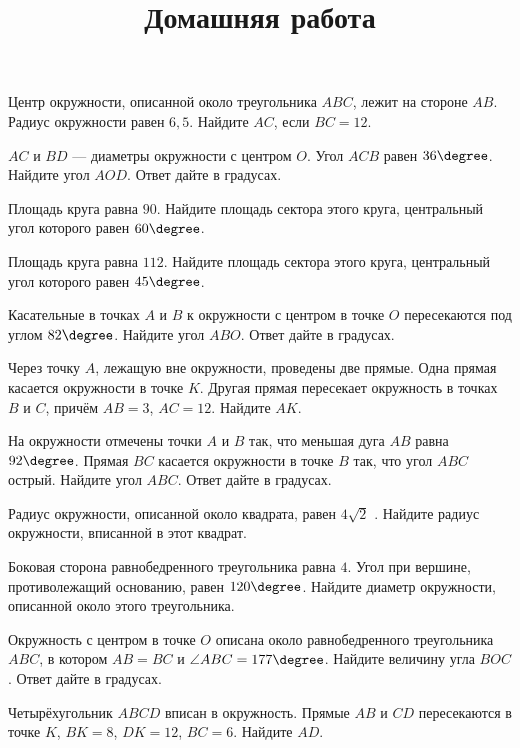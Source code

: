 \begin{consultation}
	\begin{listofex}
		\item Центр окружности, описанной около треугольника \( ABC \), лежит на стороне \( AB \). Радиус окружности равен \( 6,5 \). Найдите \( AC \), если \( BC=12 \).
		\item \( AC \) и \( BD \) --- диаметры окружности с центром \( O \). Угол \( ACB \) равен \( 36\degree \). Найдите угол \( AOD \). Ответ дайте в градусах.
		\item Площадь круга равна \( 90 \). Найдите площадь сектора этого круга, центральный угол которого равен \( 60\degree \).
		\item Площадь круга равна \( 112 \). Найдите площадь сектора этого круга, центральный угол которого равен \( 45\degree \).
		\item Касательные в точках \( A \) и \( B \) к окружности с центром в точке \( O \) пересекаются под углом \( 82\degree \). Найдите угол \( ABO \). Ответ дайте в градусах.
		\item Через точку \( A \), лежащую вне окружности, проведены две прямые. Одна прямая касается окружности в точке \( K \). Другая прямая пересекает окружность в точках \( B \) и \( C \), причём \( AB=3 \), \( AC=12 \). Найдите \( AK \).
		\item На окружности отмечены точки \( A \) и \( B \) так, что меньшая дуга \( AB \) равна \( 92\degree \). Прямая \( BC \) касается окружности в точке \( B \) так, что угол \( ABC \) острый. Найдите угол \( ABC \). Ответ дайте в градусах.
		\item Радиус окружности, описанной около квадрата, равен \( 4\sqrt{2} \) . Найдите радиус окружности, вписанной в этот квадрат.
		\item Боковая сторона равнобедренного треугольника равна \( 4 \). Угол при вершине, противолежащий основанию, равен \( 120\degree \). Найдите диаметр окружности, описанной около этого треугольника.
		\item Окружность с центром в точке \( O \) описана около равнобедренного треугольника \( ABC \), в котором \( AB=BC \) и \( \angle ABC=177\degree \). Найдите величину угла \( BOC \). Ответ дайте в градусах.
		\item Четырёхугольник \( ABCD \) вписан в окружность. Прямые \( AB \) и \( CD \) пересекаются в точке \( K \), \( BK=8 \), \( DK=12 \), \( BC=6 \). Найдите \( AD \).
	\end{listofex}
	\newpage
	\title{Домашняя работа}

\end{consultation}
